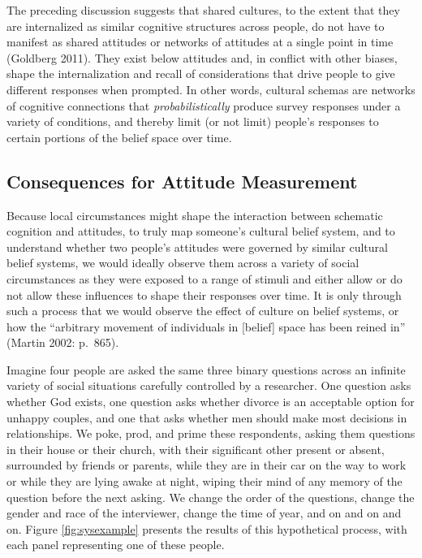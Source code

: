 \documentclass[12pt,]{article}
\begin{document}
The preceding discussion suggests that shared cultures, to the extent that they are internalized as similar cognitive structures across people, do not have to manifest as shared attitudes or networks of attitudes at a single point in time (Goldberg 2011). They exist below attitudes and, in conflict with other biases, shape the internalization and recall of considerations that drive people to give different responses when prompted. In other words, cultural schemas are networks of cognitive connections that \emph{probabilistically} produce survey responses under a variety of conditions, and thereby limit (or not limit) people's responses to certain portions of the belief space over time.

\hypertarget{consequences-for-attitude-measurement}{%
\subsection{Consequences for Attitude Measurement}\label{consequences-for-attitude-measurement}}

Because local circumstances might shape the interaction between schematic cognition and attitudes, to truly map someone's cultural belief system, and to understand whether two people's attitudes were governed by similar cultural belief systems, we would ideally observe them across a variety of social circumstances as they were exposed to a range of stimuli and either allow or do not allow these influences to shape their responses over time. It is only through such a process that we would observe the effect of culture on belief systems, or how the ``arbitrary movement of individuals in {[}belief{]} space has been reined in'' (Martin 2002: p.~865).

Imagine four people are asked the same three binary questions across an infinite variety of social situations carefully controlled by a researcher. One question asks whether God exists, one question asks whether divorce is an acceptable option for unhappy couples, and one that asks whether men should make most decisions in relationships. We poke, prod, and prime these respondents, asking them questions in their house or their church, with their significant other present or absent, surrounded by friends or parents, while they are in their car on the way to work or while they are lying awake at night, wiping their mind of any memory of the question before the next asking. We change the order of the questions, change the gender and race of the interviewer, change the time of year, and on and on and on. Figure \ref{fig:sysexample} presents the results of this hypothetical process, with each panel representing one of these people.
\end{document}
